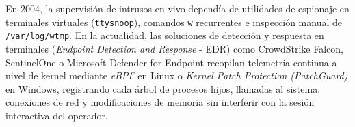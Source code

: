 \begin{perspectiva20}
En 2004, la supervisión de intrusos en vivo dependía de utilidades de espionaje en terminales virtuales (\texttt{ttysnoop}), comandos \texttt{w} recurrentes e inspección manual de \texttt{/var/log/wtmp}. En la actualidad, las soluciones de detección y respuesta en terminales (\textit{Endpoint Detection and Response} - EDR) como CrowdStrike Falcon, SentinelOne o Microsoft Defender for Endpoint recopilan telemetría continua a nivel de kernel mediante \textit{eBPF} en Linux o \textit{Kernel Patch Protection (PatchGuard)} en Windows, registrando cada árbol de procesos hijos, llamadas al sistema, conexiones de red y modificaciones de memoria sin interferir con la sesión interactiva del operador.
\end{perspectiva20}

